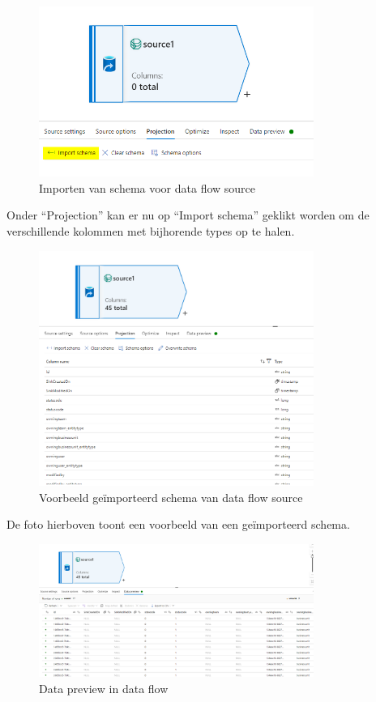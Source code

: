 \begin{figure}[H]
    \centering
    \includegraphics[width=0.8\textwidth]{./graphics/adf/source_table_6_specific.png}
    \caption{Importen van schema voor data flow source}
\end{figure}

Onder ``Projection'' kan er nu op ``Import schema'' geklikt worden om de verschillende kolommen met bijhorende types op te halen.

\begin{figure}[H]
    \centering
    \includegraphics[width=0.8\textwidth]{./graphics/adf/source_table_7_specific.png}
    \caption{Voorbeeld geïmporteerd schema van data flow source}
\end{figure}

De foto hierboven toont een voorbeeld van een geïmporteerd schema.

\begin{figure}[H]
    \centering
    \includegraphics[width=0.8\textwidth]{./graphics/adf/source_table_8_specific.png}
    \caption{Data preview in data flow}
\end{figure}

